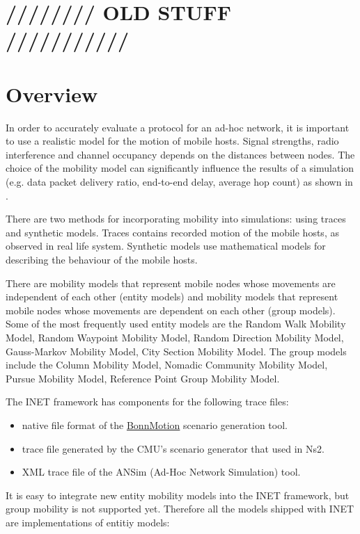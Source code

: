 \section{//////// OLD STUFF ///////////}
\section{Overview}

In order to accurately evaluate a protocol for an ad-hoc network,
it is important to use a realistic model for the motion of mobile
hosts. Signal strengths, radio interference and channel occupancy
depends on the distances between nodes. The choice of the mobility
model can significantly influence the results of a simulation
(e.g. data packet delivery ratio, end-to-end delay, average hop count)
as shown in \cite{Camp02asurvey}.

There are two methods for incorporating mobility into simulations:
using traces and synthetic models. Traces contains recorded motion
of the mobile hosts, as observed in real life system. Synthetic models
use mathematical models for describing the behaviour of the mobile hosts.

There are mobility models that represent mobile nodes whose movements
are independent of each other (entity models) and mobility models
that represent mobile nodes whose movements are dependent on each other
(group models). Some of the most frequently used entity models are the
Random Walk Mobility Model, Random Waypoint Mobility Model, Random
Direction Mobility Model, Gauss-Markov Mobility Model, City Section
Mobility Model. The group models include the Column Mobility Model,
Nomadic Community Mobility Model, Pursue Mobility Model,
Reference Point Group Mobility Model.

The INET framework has components for the following trace files:

\begin{itemize}
\item {} native file format of the
    \href{http://net.cs.uni-bonn.de/wg/cs/applications/bonnmotion/}{BonnMotion}
    scenario generation tool.
\item {} trace file generated by the CMU's scenario generator that used in Ns2.
\item {} XML trace file of the ANSim (Ad-Hoc Network Simulation) tool.
\end{itemize}

It is easy to integrate new entity mobility models into the INET framework,
but group mobility is not supported yet. Therefore all the models
shipped with INET are implementations of entitiy models:

